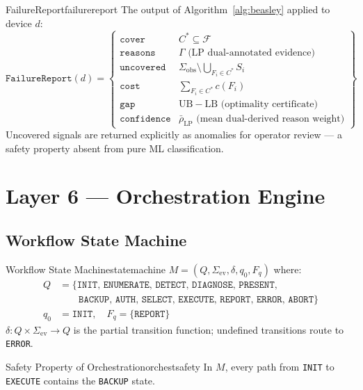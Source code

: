 \documentclass[11pt,a4paper]{report}
\newcommand{\calF}{\mathcal{F}}
\begin{document}
\begin{definition}{FailureReport}{failurereport}
The output of Algorithm~\ref{alg:beasley} applied to device $d$:
\[
\texttt{FailureReport}(d) = \left\{
  \begin{array}{ll}
    \texttt{cover}     & C^* \subseteq \calF \\
    \texttt{reasons}   & \Gamma \text{ (LP dual-annotated evidence)} \\
    \texttt{uncovered} & \Sigma_{\mathrm{obs}} \setminus \bigcup_{F_i \in C^*} S_i \\
    \texttt{cost}      & \sum_{F_i \in C^*} c(F_i) \\
    \texttt{gap}       & \mathrm{UB} - \mathrm{LB} \text{ (optimality certificate)} \\
    \texttt{confidence}& \bar{\rho}_{\mathrm{LP}} \text{ (mean dual-derived reason weight)}
  \end{array}
\right\}
\]
Uncovered signals are returned explicitly as anomalies for operator review --- a safety property absent from pure ML classification.
\end{definition}

\chapter{Layer 6 --- Orchestration Engine}

\section{Workflow State Machine}

\begin{definition}{Workflow State Machine}{statemachine}
$M = (Q, \Sigma_{\mathrm{ev}}, \delta, q_0, F_q)$ where:
\begin{align*}
Q &= \{\texttt{INIT, ENUMERATE, DETECT, DIAGNOSE, PRESENT,}\\
  &\qquad \texttt{BACKUP, AUTH, SELECT, EXECUTE, REPORT, ERROR, ABORT}\}\\
q_0 &= \texttt{INIT}, \quad F_q = \{\texttt{REPORT}\}
\end{align*}
$\delta : Q \times \Sigma_{\mathrm{ev}} \to Q$ is the partial transition function; undefined transitions route to \texttt{ERROR}.
\end{definition}

\begin{theorem}{Safety Property of Orchestration}{orchestsafety}
In $M$, every path from \texttt{INIT} to \texttt{EXECUTE} contains the \texttt{BACKUP} state.
\end{theorem}
\end{document}
